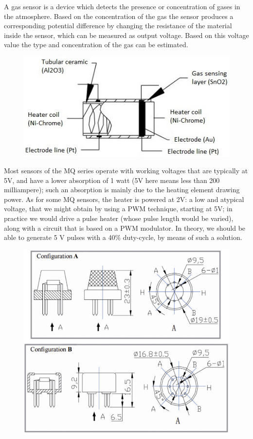 \documentclass{article}\usepackage[]{graphicx}\usepackage[]{color}
\begin{document}
A gas sensor is a device which detects the presence or concentration of gases in the atmosphere. Based on the concentration of the gas the sensor produces a corresponding potential difference by changing the resistance of the material inside the sensor, which can be measured as output voltage. Based on this voltage value the type and concentration of the gas can be estimated.

\begin{figure}
\includegraphics[width=1.0\textwidth]{Sensing-Element-in-Gas-Sensor.jpg}
\end{figure}

Most sensors of the MQ series operate with working voltages that are typically at 5V, and have a lower absorption of 1 watt (5V here means less than 200 milliampere); such an absorption is mainly due to the heating element drawing power. As for some MQ sensors, the heater is powered at 2V: a low and atypical voltage, that we might obtain by using a PWM technique, starting at 5V; in practice we would drive a pulse heater (whose pulse length would be varied), along with a circuit that is based on a PWM modulator. In theory, we should be able to generate 5 V pulses with a 40\% duty-cycle, by means of such a solution.

\begin{figure}
\includegraphics[width=1.0\textwidth]{MQ-X.png}
\end{figure}
\end{document}
